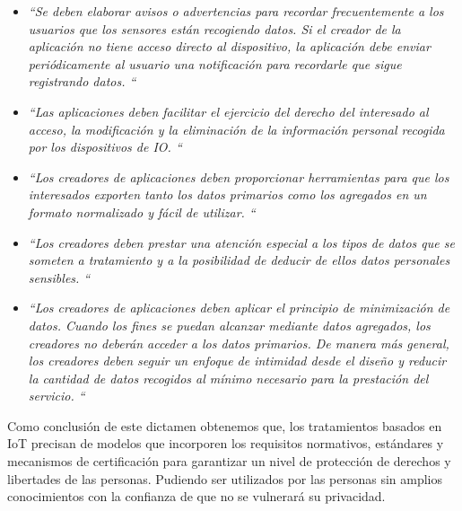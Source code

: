 {\begin{itemize}
    \item \textit{``Se deben elaborar avisos o advertencias para recordar frecuentemente a los usuarios que los sensores están recogiendo datos. Si el creador de la aplicación no tiene acceso directo al dispositivo, la aplicación debe enviar periódicamente al usuario una notificación para recordarle que sigue registrando datos. ``}
    \item \textit{``Las aplicaciones deben facilitar el ejercicio del derecho del interesado al acceso, la modificación y la eliminación de la información personal recogida por los dispositivos de IO. ``}
    \item \textit{``Los creadores de aplicaciones deben proporcionar herramientas para que los interesados exporten tanto los datos primarios como los agregados en un formato normalizado y fácil de utilizar. ``}
    \item \textit{``Los creadores deben prestar una atención especial a los tipos de datos que se someten a tratamiento y a la posibilidad de deducir de ellos datos personales sensibles. ``}
    \item \textit{``Los creadores de aplicaciones deben aplicar el principio de minimización de datos. Cuando los fines se puedan alcanzar mediante datos agregados, los creadores no deberán acceder a los datos primarios. De manera más general, los creadores deben seguir un enfoque de intimidad desde el diseño y reducir la cantidad de datos recogidos al mínimo necesario para la prestación del servicio. ``}
\end{itemize}

Como conclusión de este dictamen obtenemos que, los tratamientos basados en IoT precisan de modelos que incorporen los requisitos normativos, estándares y mecanismos de certificación para garantizar un nivel de protección de derechos y libertades de las personas. Pudiendo ser utilizados por las personas sin amplios conocimientos con la confianza de que no se vulnerará su privacidad. \cite{aepd-info}


}